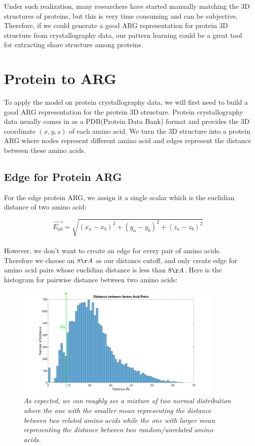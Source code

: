 Under such realization, many researchers have started manually matching the 3D structures of proteins, but this is very time consuming and can be subjective. Therefore, if we could generate a good ARG representation for protein 3D structure from crystallography data, our pattern learning could be a great tool for extracting share structure among proteins.

\section{Protein to ARG}

To apply the model on protein crystallography data, we will first need to build a good ARG representation for the protein 3D structure. Protein crystallography data usually comes in as a PDB(Protein Data Bank) format and provides the 3D coordinate $(x, y, z)$ of each amino acid. We turn the 3D structure into a protein ARG where nodes represent different amino acid and edges represent the distance between these amino acids.

\subsection{Edge for Protein ARG}

For the edge protein ARG, we assign it a single scalar which is the euclidian distance of two amino acid:

\begin{equation} 
\overrightarrow{E_{ab}}=\sqrt{(x_a-x_b)^2+(y_a-y_b)^2+(z_a-z_b)^2}
\end{equation}\\

However, we don't want to create an edge for every pair of amino acids. Therefore we choose an $8\AA$ as our distance cutoff, and only create edge for amino acid pairs whose euclidian distance is less than $8\AA$. Here is the histogram for pairwise distance between two amino acids:

\begin{figure}[h]
	\centering
	\captionsetup{justification=centering}
	\includegraphics[width=0.9\textwidth]{figs/distance.png}
	\caption[Caption for LOF]{\emph{As expected, we can roughly see a mixture of two normal distribution where the one with the smaller mean representing the distance between two related amino acids while the one with larger mean representing the distance between two random/unrelated amino acids.}}
	\label{fig:distance}
\end{figure}

